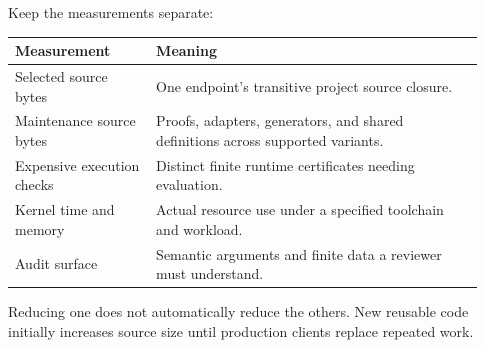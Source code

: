 \documentclass[11pt,letterpaper]{article}
\theoremstyle{definition}\newtheorem{definition}[theorem]{Definition}
\begin{document}
Keep the measurements separate:
\begin{center}
\begin{tabular}{@{}p{0.28\linewidth}p{0.65\linewidth}@{}}
\toprule Measurement & Meaning\\\midrule
Selected source bytes & One endpoint's transitive project source closure.\\
Maintenance source bytes & Proofs, adapters, generators, and shared definitions across supported variants.\\
Expensive execution checks & Distinct finite runtime certificates needing evaluation.\\
Kernel time and memory & Actual resource use under a specified toolchain and workload.\\
Audit surface & Semantic arguments and finite data a reviewer must understand.\\
\bottomrule
\end{tabular}
\end{center}
Reducing one does not automatically reduce the others. New reusable code initially increases source size until production clients replace repeated work.




\end{document}
